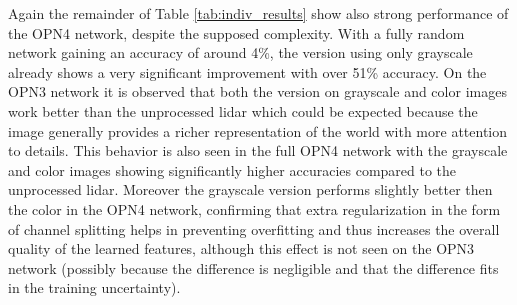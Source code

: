 Again the remainder of Table \ref{tab:indiv_results} show also strong performance of the OPN4 network, despite the supposed complexity. With a fully random network gaining an accuracy of around 4\%, the version using only grayscale already shows a very significant improvement with over 51\% accuracy. On the OPN3 network it is observed that both the version on grayscale and color images work better than the unprocessed lidar which could be expected because the image generally provides a richer representation of the world with more attention to details. This behavior is also seen in the full OPN4 network with the grayscale and color images showing significantly higher accuracies compared to the unprocessed lidar. Moreover the grayscale version performs slightly better then the color in the OPN4 network, confirming that extra regularization in the form of channel splitting helps in preventing overfitting and thus increases the overall quality of the learned features, although this effect is not seen on the OPN3 network (possibly because the difference is negligible and that the difference fits in the training uncertainty).



